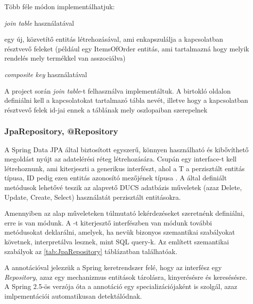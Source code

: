 Több féle módon implementálhatjuk: 

\begin{listing}
	\item \emph{join table} használatával
	\item egy új, közvetítő entitás létrehozásával, ami enkapszulálja a kapcsolatban résztvevő feleket (például egy ItemsOfOrder entitás, ami tartalmazná hogy melyik rendelés mely termékkel van asszociálva)
	\item \emph{composite key} használatával
\end{listing}

A project során \emph{join table}-t felhasználva implementáltuk. A birtokló oldalon definiálni kell a kapcsolatokat tartalmazó tábla nevét, illetve hogy a kapcsolatban résztvevő felek id-jai ennek a táblának mely oszlopaiban szerepelnek \par


\subsubsection{JpaRepository, @Repository}

A Spring Data JPA által biztosított  egyszerű, könnyen használható és kibővíthető megoldást nyújt az adatelérési réteg létrehozására. Csupán egy interface-t kell létrehoznunk, ami kiterjeszti a  generikus interfészt, ahol a T a perzisztált entitás típusa, ID pedig ezen entitás azonosító mezőjének típusa \cite{jpaRepositoryDocumentation}. A  által definiált metódusok lehetővé teszik az alapvető  DUCS adatbázis műveletek (azaz Delete, Update, Create, Select) használatát perzisztált entitásokra. \par

Amennyiben az alap műveleteken túlmutató lekérdezéseket szeretnénk definiálni, erre is van módunk. A -t kiterjesztő interfészben van módunk további metódusokat deklarálni, amelyek, ha nevük bizonyos szemantikai szabályokat követnek, interpretálva lesznek, mint SQL query-k. Az említett szemantikai szabályok az \ref{tab:JpaRepository} táblázatban találhatóak. \par

A  annotációval jelezzük a Spring keretrendszer felé, hogy az interfész egy \emph{Repository}, azaz egy mechanizmus entitások tárolásra, kinyerésésre és keresésésre. A Spring 2.5-ös verzója óta a  annotáció egy specializációjaként is szolgál, azaz imlpementációi automatikusan detektálódnak.

